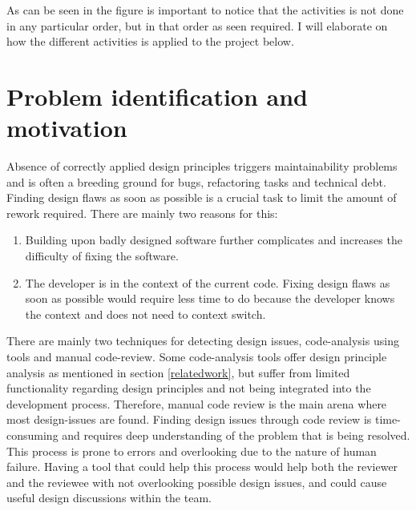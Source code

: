 \documentclass{report}
\begin{document}
As can be seen in the figure is important to notice that the activities is not done in any particular order, but in that order as seen required. I will elaborate on how the different activities is applied to the project below. 



\section{Problem identification and motivation}
Absence of correctly applied design principles triggers maintainability problems and is often a breeding ground for bugs, refactoring tasks and technical debt. Finding design flaws as soon as possible is a crucial task to limit the amount of rework required. There are mainly two reasons for this: 

\begin{enumerate}
    \item Building upon badly designed software further complicates and increases the difficulty of fixing the software.

    \item The developer is in the context of the current code. Fixing design flaws as soon as possible would require less time to do because the developer knows the context and does not need to context switch.

\end{enumerate}


There are mainly two techniques for detecting design issues, code-analysis using tools and manual code-review. Some code-analysis tools offer design principle analysis as mentioned in section \ref{relatedwork}, but suffer from limited functionality regarding design principles and not being integrated into the development process. Therefore, manual code review is the main arena where most design-issues are found. Finding design issues through code review is time-consuming and requires deep understanding of the problem that is being resolved. This process is prone to errors and overlooking due to the nature of human failure. Having a tool that could help this process would help both the reviewer and the reviewee with not overlooking possible design issues, and could cause useful design discussions within the team.
\end{document}

